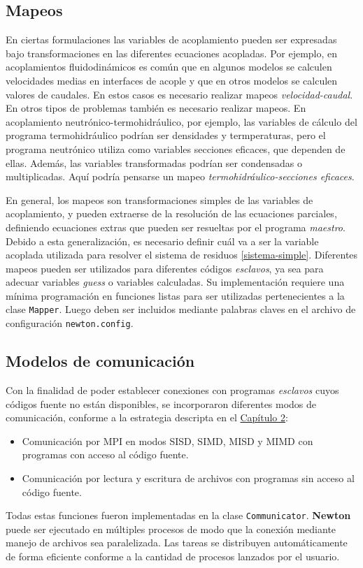 \subsection*{Mapeos}
\label{ap2:mappers}

En ciertas formulaciones las variables de acoplamiento pueden ser expresadas bajo transformaciones en las diferentes ecuaciones acopladas.
Por ejemplo, en acoplamientos fluidodinámicos es común que en algunos modelos se calculen velocidades medias en interfaces de acople
y que en otros modelos se calculen valores de caudales.
En estos casos es necesario realizar mapeos \textit{velocidad-caudal}.
En otros tipos de problemas también es necesario realizar mapeos.
En acoplamiento neutrónico-termohidráulico, por ejemplo, las variables de cálculo del programa termohidráulico podrían ser densidades y termperaturas,
pero el programa neutrónico utiliza como variables secciones eficaces, que dependen de ellas.
Además, las variables transformadas podrían ser condensadas o multiplicadas.
Aquí podría pensarse un mapeo \textit{termohidráulico-secciones eficaces}.

En general, los mapeos son transformaciones simples de las variables de acoplamiento, y pueden extraerse de la resolución de las ecuaciones parciales,
definiendo ecuaciones extras que pueden ser resueltas por el programa \textit{maestro}.
Debido a esta generalización, es necesario definir cuál va a ser la variable acoplada utilizada para resolver el sistema de residuos \ref{sistema-simple}.
Diferentes mapeos pueden ser utilizados para diferentes códigos \textit{esclavos}, ya sea para adecuar variables \textit{guess} o variables calculadas.
Su implementación requiere una mínima programación en funciones listas para ser utilizadas pertenecientes a la clase \texttt{Mapper}.
Luego deben ser incluidos mediante palabras claves en el archivo de configuración \texttt{newton.config}.

\subsection*{Modelos de comunicación}
\label{ap2:comm}

Con la finalidad de poder establecer conexiones con programas \textit{esclavos} cuyos códigos fuente no están disponibles,
se incorporaron diferentes modos de comunicación, conforme a la estrategia descripta en el \hyperlink{chapter.2}{Capítulo 2}:
\begin{itemize}
\item Comunicación por MPI en modos SISD, SIMD, MISD y MIMD con programas con acceso al código fuente.
\item Comunicación por lectura y escritura de archivos con programas sin acceso al código fuente.
\end{itemize}
Todas estas funciones fueron implementadas en la clase \texttt{Communicator}.
\textbf{Newton} puede ser ejecutado en múltiples procesos de modo que la conexión mediante manejo de archivos sea paralelizada.
Las tareas se distribuyen automáticamente de forma eficiente conforme a la cantidad de procesos lanzados por el usuario.

